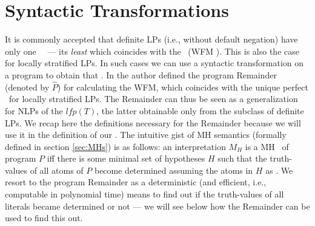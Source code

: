 \documentclass{llncs}
\begin{document}
	\section{Syntactic Transformations}
		It is commonly accepted that definite LPs (i.e., without default negation) have only one \twov\ \m\ --- its \emph{least \m} which coincides
		with the \WFM\ (WFM \cite{WFS}).
		This is also the case for locally stratified LPs.
		In such cases we can use a syntactic transformation on a program to obtain that \m.
		In \cite{DBLP:journals/tplp/BrassDFZ01} the author defined the program Remainder (denoted by $\widehat{P}$) for calculating the
		WFM, which coincides with the unique perfect \m\ for locally stratified LPs.
		The Remainder can thus be seen as a generalization for NLPs of the $lfp(T)$, the latter obtainable only from the subclass of definite LPs.
		We recap here the definitions necessary for the Remainder because we will use it in the definition of our \MHs.
		The intuitive gist of MH semantics (formally defined in section \ref{sec:MHs}) is as follows: an interpretation $M_H$ is a MH \m\ of program $P$ iff 
		there is some minimal set of hypotheses $H$ such that the truth-values of all atoms of $P$ become determined assuming the atoms in $H$
		as \true.
		We resort to the program Remainder as a deterministic (and efficient, i.e., computable in polynomial time) means to find out if
		the truth-values of all literals became determined or not --- we will see below how the Remainder can be used to find this out.
		
\end{document}
